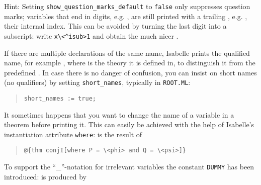 \begin{isabellebody}
\begin{isamarkuptext}
Hint: Setting \verb!show_question_marks_default! to \texttt{false} only
suppresses question marks; variables that end in digits,
e.g. , are still printed with a trailing ,
e.g. , their internal index. This can be avoided by
turning the last digit into a subscript: write \verb!x\<^isub>1! and
obtain the much nicer .%
\end{isamarkuptext}%
\isamarkuptrue%
%
\isamarkuptrue%
%
\begin{isamarkuptext}%
If there are multiple declarations of the same name, Isabelle prints
the qualified name, for example , where  is the
theory it is defined in, to distinguish it from the predefined . In case there is no danger of confusion, you can insist on
short names (no qualifiers) by setting \verb!short_names!, typically
in \texttt{ROOT.ML}:
\begin{quote}
\verb|short_names := true|\verb!;!
\end{quote}%
\end{isamarkuptext}%
\isamarkuptrue%
%
\isamarkuptrue%
%
\begin{isamarkuptext}%
It sometimes happens that you want to change the name of a
variable in a theorem before printing it. This can easily be achieved
with the help of Isabelle's instantiation attribute \texttt{where}:
 is the result of
\begin{quote}
\verb!@!\verb!{thm conjI[where P = \<phi> and Q = \<psi>]}!
\end{quote}
To support the ``\_''-notation for irrelevant variables
the constant \texttt{DUMMY} has been introduced:
 is produced by

\end{isamarkuptext}
\end{isabellebody}
